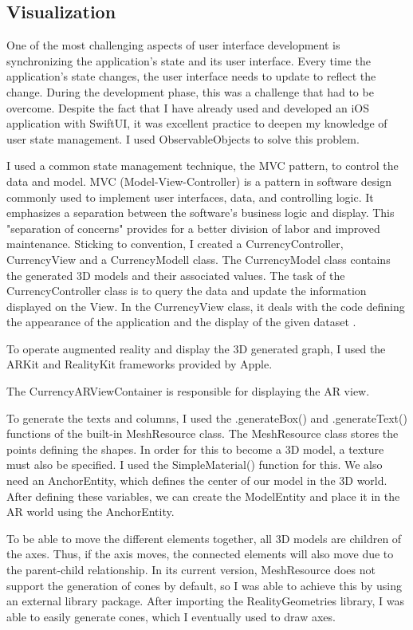 \documentclass[a4paper,oneside]{article}
\begin{document}

\subsection{Visualization}


One of the most challenging aspects of user interface development is synchronizing the application's state and its user interface. Every time the application's state changes, the user interface needs to update to reflect the change. During the development phase, this was a challenge that had to be overcome. Despite the fact that I have already used and developed an iOS application with SwiftUI, it was excellent practice to deepen my knowledge of user state management. I used ObservableObjects to solve this problem.

I used a common state management technique, the MVC pattern, to control the data and model. MVC (Model-View-Controller) is a pattern in software design commonly used to implement user interfaces, data, and controlling logic. It emphasizes a separation between the software's business logic and display. This "separation of concerns" provides for a better division of labor and improved maintenance.  Sticking to convention, I created a CurrencyController, CurrencyView and a CurrencyModell class. The CurrencyModel class contains the generated 3D models and their associated values. The task of the CurrencyController class is to query the data and update the information displayed on the View. In the CurrencyView class, it deals with the code defining the appearance of the application and the display of the given dataset \cite{mozilla}.

To operate augmented reality and display the 3D generated graph, I used the ARKit and RealityKit frameworks provided by Apple.

The CurrencyARViewContainer is responsible for displaying the AR view.

To generate the texts and columns, I used the .generateBox() and .generateText() functions of the built-in MeshResource class.
The MeshResource class stores the points defining the shapes. In order for this to become a 3D model, a texture must also be specified. I used the SimpleMaterial() function for this.
We also need an AnchorEntity, which defines the center of our model in the 3D world.
After defining these variables, we can create the ModelEntity and place it in the AR world using the AnchorEntity.


To be able to move the different elements together, all 3D models are children of the axes. Thus, if the axis moves, the connected elements will also move due to the parent-child relationship. In its current version, MeshResource does not support the generation of cones by default, so I was able to achieve this by using an external library package. After importing the RealityGeometries library, I was able to easily generate cones, which I eventually used to draw axes.
\end{document}
